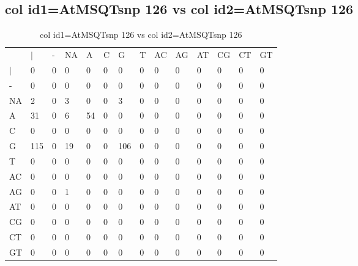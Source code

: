 \subsection{col id1=AtMSQTsnp 126 vs col id2=AtMSQTsnp 126}
\begin{center}
\begin{longtable}{|l|l|l|l|l|l|l|l|l|l|l|l|l|l|}
\caption{col id1=AtMSQTsnp 126 vs col id2=AtMSQTsnp 126} \label{table_dm702}\\
\hline
\\
\hline
&$|$&-&NA&A&C&G&T&AC&AG&AT&CG&CT&GT\\
$|$&0&0&0&0&0&0&0&0&0&0&0&0&0\\
-&0&0&0&0&0&0&0&0&0&0&0&0&0\\
NA&2&0&3&0&0&3&0&0&0&0&0&0&0\\
A&31&0&6&54&0&0&0&0&0&0&0&0&0\\
C&0&0&0&0&0&0&0&0&0&0&0&0&0\\
G&115&0&19&0&0&106&0&0&0&0&0&0&0\\
T&0&0&0&0&0&0&0&0&0&0&0&0&0\\
AC&0&0&0&0&0&0&0&0&0&0&0&0&0\\
AG&0&0&1&0&0&0&0&0&0&0&0&0&0\\
AT&0&0&0&0&0&0&0&0&0&0&0&0&0\\
CG&0&0&0&0&0&0&0&0&0&0&0&0&0\\
CT&0&0&0&0&0&0&0&0&0&0&0&0&0\\
GT&0&0&0&0&0&0&0&0&0&0&0&0&0\\
\hline
\end{longtable}
\end{center}


